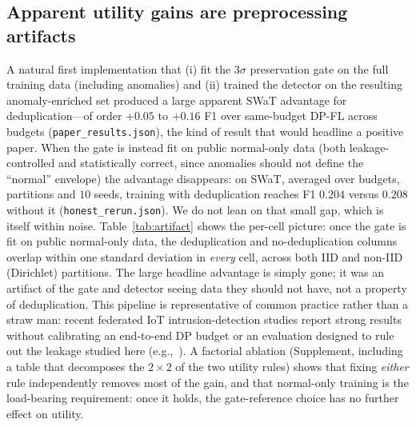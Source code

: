 \documentclass[pdflatex,sn-mathphys-num]{sn-jnl}
\theoremstyle{thmstyleone}
\theoremstyle{thmstyletwo}
\theoremstyle{thmstylethree}
\begin{document}
\subsection{Apparent utility gains are preprocessing artifacts}\label{sec:res-artifact}
A natural first implementation that (i) fit the $3\sigma$ preservation gate on the
full training data (including anomalies) and (ii) trained the detector on the
resulting anomaly-enriched set produced a large apparent SWaT advantage for
deduplication---of order $+0.05$ to $+0.16$ F1 over same-budget DP-FL across
budgets (\texttt{paper\_results.json}), the kind of result that would headline a
positive paper. When the gate is instead fit on public normal-only data (both
leakage-controlled and statistically correct, since anomalies should not define the
``normal'' envelope) the advantage disappears: on SWaT, averaged over budgets,
partitions and $10$ seeds, training with deduplication reaches F1 $0.204$ versus
$0.208$ without it (\texttt{honest\_rerun.json}). We do not lean on that small gap,
which is itself within noise. Table~\ref{tab:artifact} shows the per-cell picture:
once the gate is fit on public normal-only data, the deduplication and
no-deduplication columns overlap within one standard deviation in \emph{every} cell,
across both IID and non-IID (Dirichlet) partitions. The large headline advantage is
simply gone; it was an artifact of the gate and detector seeing data they should not
have, not a property of deduplication. This pipeline is representative of common
practice rather than a straw man: recent federated IoT intrusion-detection studies
report strong results without calibrating an end-to-end DP budget or an evaluation
designed to rule out the leakage studied here
(e.g.,~\cite{khraisat2025federated,karunamurthy2025optimal}). A factorial ablation (Supplement, including a
table that decomposes the $2\times2$ of the two utility rules) shows that fixing
\emph{either} rule independently removes most of the gain, and that normal-only
training is the load-bearing requirement: once it holds, the gate-reference choice has
no further effect on utility.
\end{document}
